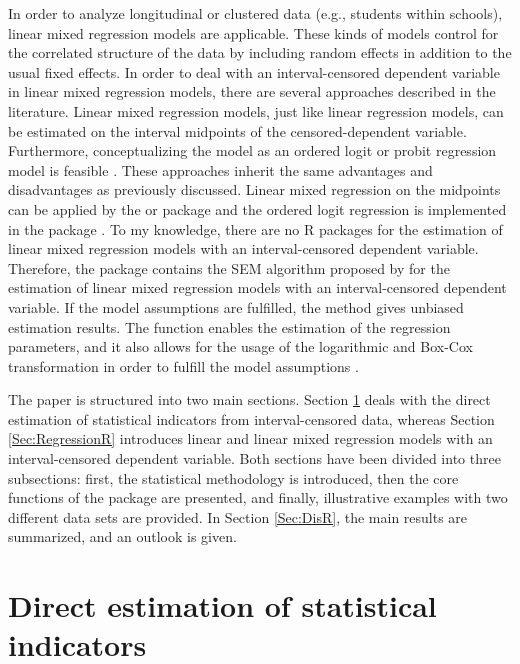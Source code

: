 In order to analyze longitudinal or clustered data (e.g., students within schools), linear mixed regression models are applicable. These kinds of models control for the correlated structure of the data by including random effects in addition to the usual fixed effects. In order to deal with an interval-censored dependent variable in linear mixed regression models, there are several approaches described in the literature. Linear mixed regression models, just like linear regression models, can be estimated on the interval midpoints of the censored-dependent variable. Furthermore, conceptualizing the model as an ordered logit or probit regression model is feasible \citep{Agr10}. These approaches inherit the same advantages and disadvantages as previously discussed. Linear mixed regression on the midpoints can be applied by the  \citep{Dou20, Dou15} or  \citep{Pin20} package and the ordered logit regression is implemented in the  package \citep{Chr15}. To my knowledge, there are no R packages for the estimation of linear mixed regression models with an interval-censored dependent variable. Therefore, the package  contains the SEM algorithm proposed by \citet{Wal19} for the estimation of linear mixed regression models with an interval-censored dependent variable. If the model assumptions are fulfilled, the method gives unbiased estimation results. The function  enables the estimation of the regression parameters, and it also allows for the usage of the logarithmic and Box-Cox transformation in order to fulfill the model assumptions \citep{Gur06}.


The paper is structured into two main sections. Section \ref{Sec:DirectR} deals with the direct estimation of statistical indicators from interval-censored data, whereas Section \ref{Sec:RegressionR} introduces linear and linear mixed regression models with an interval-censored dependent variable. Both sections have been divided into three subsections: first, the statistical methodology is introduced, then the core functions of the  package are presented, and finally, illustrative examples with two different data sets are provided. In Section \ref{Sec:DisR}, the main results are summarized, and an outlook is given.


\section{Direct estimation of statistical indicators}\label{Sec:DirectR}

